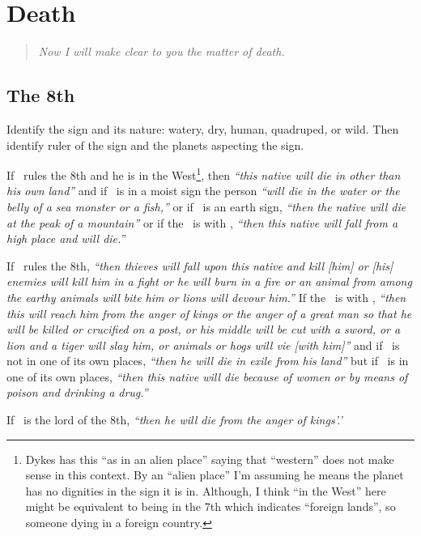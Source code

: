 \section{Death}
\begin{quote}
\textsl{Now I will make clear to you the matter of death.}
\end{quote}

\subsection{The 8th}

Identify the sign and its nature: watery, dry, human, quadruped, or wild. Then identify ruler of the sign and the planets aspecting the sign.

If  \Saturn\, rules the 8th and he is in the West\footnote{Dykes has this ``as in an alien place'' saying that ``western'' does not make sense in this context. By an ``alien place'' I'm assuming he means the planet has no dignities in the sign it is in. Although, I think ``in the West'' here might be equivalent to being in the 7th which indicates ``foreign lands'', so someone dying in a foreign country.}, then \textsl{``this native will die in other than his own land''} and if \Saturn\, is in a moist sign the person \textsl{``will die in the water or the belly of a sea monster or a fish,''} or if \Saturn\ is an earth sign, \textsl{``then the native will die at the peak of a mountain''} or if the \Sun\, is with \Saturn, \textsl{``then this native will fall from a high place and will die.''}

If  \Mars\, rules the 8th, \textsl{``then thieves will fall upon this native and kill [him] or [his] enemies will kill him in a fight or he will burn in a fire or an animal from among the earthy animals will bite him or lions will devour him.''} If the \Sun\, is with \Mars, \textsl{``then this will reach him from the anger of kings or the anger of a great man so that he will be killed or crucified on a post, or his middle will be cut with a sword, or a lion and a tiger will slay him, or animals or hogs will vie [with him]''} and if \Mars\, is not in one of its own places, \textsl{``then he will die in exile from his land''} but if \Mars\, is in one of its own places, \textsl{``then this native will die because of women or by means of poison and drinking a drug.''}

If  \Mercury\, is the lord of the 8th, \textsl{``then he will die from the anger of kings'.'}

